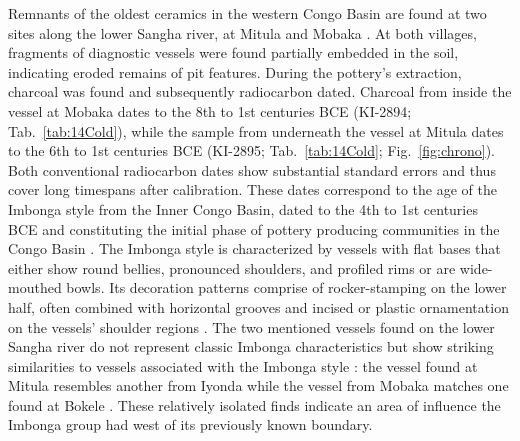 \documentclass[smallextended,natbib]{svjour3}       %
\begin{document}
Remnants of the oldest ceramics in the western Congo Basin are found at two sites along the lower Sangha river, at Mitula and Mobaka \citep[Fig.~\ref{fig:map};][169--172, 306--307]{Seidensticker.2021e}. At both villages, fragments of diagnostic vessels were found partially embedded in the soil, indicating eroded remains of pit features. During the pottery's extraction, charcoal was found and subsequently radiocarbon dated. Charcoal from inside the vessel at Mobaka dates to the 8th to 1st centuries BCE (KI-2894; Tab.~\ref{tab:14Cold}), while the sample from underneath the vessel at Mitula dates to the 6th to 1st centuries BCE (KI-2895; Tab.~\ref{tab:14Cold}; Fig.~\ref{fig:chrono}). Both conventional radiocarbon dates show substantial standard errors and thus cover long timespans after calibration. These dates correspond to the age of the Imbonga style from the Inner Congo Basin, dated to the 4th to 1st centuries BCE and constituting the initial phase of pottery producing communities in the Congo Basin \citep[Fig.~\ref{fig:chrono}; S1; Tab.~S1;][59--68]{Wotzka.1995}. The Imbonga style is characterized by vessels with flat bases that either show round bellies, pronounced shoulders, and profiled rims or are wide-mouthed bowls. Its decoration patterns comprise of rocker-stamping on the lower half, often combined with horizontal grooves and incised or plastic ornamentation on the vessels' shoulder regions \citep[196 Fig.~93.1--4]{Seidensticker.2021e}. The two mentioned vessels found on the lower Sangha river do not represent classic Imbonga characteristics but show striking similarities to vessels associated with the Imbonga style \citep[170 Fig.~84]{Seidensticker.2021e}: the vessel found at Mitula resembles another from Iyonda \citep[441 Pl.~7.7]{Wotzka.1995} while the vessel from Mobaka matches one found at Bokele \citep[453 Pl.~19.10]{Wotzka.1995}. These relatively isolated finds indicate an area of influence the Imbonga group had west of its previously known boundary.
\end{document}
